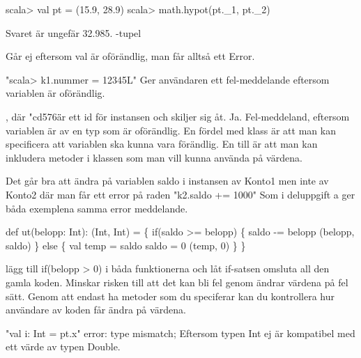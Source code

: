 

\ExerciseSolution{\ExeWeekFOUR}

\Task %
\Subtask  
\begin{REPLnonum}
scala> val pt = (15.9, 28.9)
scala> math.hypot(pt.\_1, pt.\_2)
\end{REPLnonum}
Svaret är ungefär 32.985.
\Subtask  {}
\Subtask  {}
\Subtask  {}
\Subtask  {}
\Subtask  {}
\Subtask  {}
-tupel

\Task %
\Subtask  {}
\Subtask  Går ej eftersom val är oförändlig, man får alltså ett Error.

\Task %
\Subtask  
"scala> k1.nummer = 12345L" Ger användaren ett fel-meddelande eftersom variablen är oförändlig.

\Task %
\Subtask  {}, där "cd576\" är ett id för instansen och skiljer sig åt.
\Subtask  Ja.
\Subtask  Fel-meddeland, eftersom variablen är av en typ som är oförändlig.
\Subtask  En fördel med klass är att man kan specificera att variablen ska kunna vara förändlig. En till är att man kan inkludera metoder i klassen som man vill kunna använda på värdena.

\Task %
\Subtask 
Det går bra att ändra på variablen saldo i instansen av Konto1 men inte av Konto2 där man får ett error på raden "k2.saldo += 1000"
\Subtask 
Som i deluppgift a ger båda exemplena samma error meddelande.
\Subtask 
\begin{REPLnonum}
def ut(belopp: Int): (Int, Int) = \{
	if(saldo >= belopp) \{
		saldo -= belopp
		(belopp, saldo)
	\} else \{
		val temp = saldo
		saldo = 0
		(temp, 0)
	\}
\}
\end{REPLnonum}
\Subtask 
lägg till if(belopp > 0) i båda funktionerna och låt if-satsen omsluta all den gamla koden.
\Subtask 
Minskar risken till att det kan bli fel genom ändrar värdena på fel sätt. Genom att endast ha metoder som du speciferar kan du kontrollera hur användare av koden får ändra på värdena.

\Task %
\Subtask 
"val i: Int = pt.x" error: type mismatch;
Eftersom typen Int ej är kompatibel med ett värde av typen Double.

